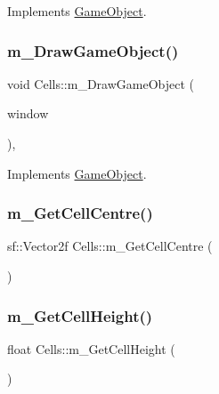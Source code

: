 Implements \mbox{\hyperlink{class_game_object_af1a0662ca445d878b163c4648f90259c}{Game\+Object}}.

\mbox{\label{class_cells_a09ab1aeac5c986cc28f52754fafd8c66}} 
\subsubsection{\texorpdfstring{m\+\_\+\+Draw\+Game\+Object()}{m\_DrawGameObject()}}
{\footnotesize\ttfamily void Cells\+::m\+\_\+\+Draw\+Game\+Object (\begin{DoxyParamCaption}\item[{sf\+::\+Render\+Window \&}]{window }\end{DoxyParamCaption})\hspace{0.3cm}{\ttfamily [override]}, {\ttfamily [virtual]}}



Implements \mbox{\hyperlink{class_game_object_a184ac59fd5167c55a54b50894e5b6721}{Game\+Object}}.

\mbox{\label{class_cells_ae61d97e90ef66528c67be257531c4359}} 
\subsubsection{\texorpdfstring{m\+\_\+\+Get\+Cell\+Centre()}{m\_GetCellCentre()}}
{\footnotesize\ttfamily sf\+::\+Vector2f Cells\+::m\+\_\+\+Get\+Cell\+Centre (\begin{DoxyParamCaption}{ }\end{DoxyParamCaption})}

\mbox{\label{class_cells_ac5885d8ebc2418182b48d19b9e7fde08}} 
\subsubsection{\texorpdfstring{m\+\_\+\+Get\+Cell\+Height()}{m\_GetCellHeight()}}
{\footnotesize\ttfamily float Cells\+::m\+\_\+\+Get\+Cell\+Height (\begin{DoxyParamCaption}{ }\end{DoxyParamCaption})}


